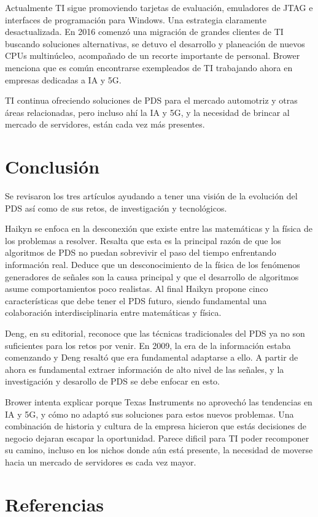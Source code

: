 \documentclass[11pt, twocolumn]{article}
\begin{document}
Actualmente TI sigue promoviendo tarjetas de evaluación, emuladores de JTAG e interfaces de programación para Windows. Una estrategia claramente desactualizada. En 2016 comenzó una migración de grandes clientes de TI buscando soluciones alternativas, se detuvo el desarrollo y planeación de nuevos CPUs multinúcleo, acompañado de un recorte importante de personal. Brower menciona que es común encontrarse exempleados de TI trabajando ahora en empresas dedicadas a IA y 5G.

TI continua ofreciendo soluciones de PDS para el mercado automotriz y otras áreas relacionadas, pero incluso ahí la IA y 5G, y la necesidad de brincar al mercado de servidores, están cada vez más presentes.


\section{Conclusión}
Se revisaron los tres artículos ayudando a tener una visión de la evolución del PDS así como de sus retos, de investigación y tecnológicos. 

Haikyn se enfoca en la desconexión que existe entre las matemáticas y la física de los problemas a resolver. Resalta que esta es la principal razón de que los algoritmos de PDS no puedan sobrevivir el paso del tiempo enfrentando información real. Deduce que un desconocimiento de la física de los fenómenos generadores de señales son la causa principal y que el desarrollo de algoritmos asume comportamientos poco realistas. Al final Haikyn propone cinco características que debe tener el PDS futuro, siendo fundamental una colaboración interdisciplinaria entre matemáticas y física.

Deng, en su editorial, reconoce que las técnicas tradicionales del PDS ya no son suficientes para los retos por venir. En 2009, la era de la información estaba comenzando y Deng resaltó que era fundamental adaptarse a ello. A partir de ahora es fundamental extraer información de alto nivel de las señales, y la investigación y desarollo de PDS se debe enfocar en esto.

Brower intenta explicar porque Texas Instruments no aprovechó las tendencias en IA y 5G, y cómo no adaptó sus soluciones para estos nuevos problemas. Una combinación de historia y cultura de la empresa hicieron que estás decisiones de negocio dejaran escapar la oportunidad. Parece dificil para TI poder recomponer su camino, incluso en los nichos donde aún está presente, la necesidad de moverse hacia un mercado de servidores es cada vez mayor.
\section{Referencias}



\end{document}
